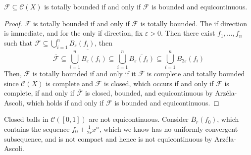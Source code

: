 \begin{cor}
    $\mathcal{F} \subseteq \mathcal{C}(X)$ is totally bounded if and only if $\mathcal{F}$ is bounded and equicontinuous.
\end{cor}
\begin{proof}
    $\mathcal{F}$ is totally bounded if and only if $\overline{\mathcal{F}}$ is totally bounded. The if direction is immediate, and for the only if direction, fix $\varepsilon > 0$. Then there exist $f_1,...,f_n$ such that $\mathcal{F} \subseteq \bigcup_{i=1}^nB_{\varepsilon}(f_i)$, then $$\overline{\mathcal{F}} \subseteq \overline{\bigcup_{i=1}^nB_{\varepsilon}(f_i)} \subseteq \bigcup_{i=1}^n\overline{B_{\varepsilon}(f_i)} \subseteq \bigcup_{i=1}^nB_{2\varepsilon}(f_i)$$
    Then, $\overline{\mathcal{F}}$ is totally bounded if and only if it $\overline{\mathcal{F}}$ is complete and totally bounded since $\mathcal{C}(X)$ is complete and $\overline{\mathcal{F}}$ is closed, which occurs if and only if $\mathcal{F}$ is complete, if and only if $\overline{\mathcal{F}}$ is closed, bounded, and equicontinuous by Arz\'{e}la-Ascoli, which holds if and only if $\mathcal{F}$ is bounded and equicontinuous.
\end{proof}

\begin{eg}
    Closed balls in $\mathcal{C}([0,1])$ are not equicontinuous. Consider $\overline{B}_r(f_0)$, which contains the sequence $f_0+\frac{1}{2r}x^n$, which we know has no uniformly convergent subsequence, and is not compact and hence is not equicontinuous by Arz\'{e}la-Ascoli.
\end{eg}

